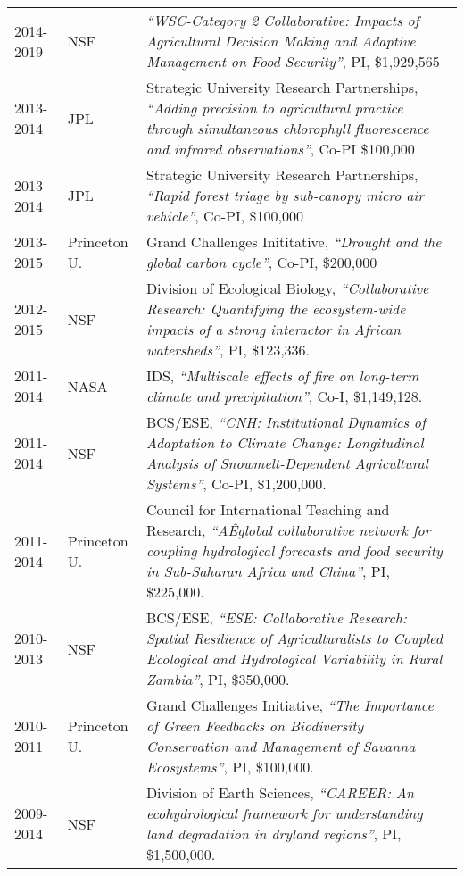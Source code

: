 \documentclass[10pt]{report}
\begin{document}
\begin{longtable}{ l p{.8in} p{5in}  }
2014-2019 & NSF & \emph{``WSC-Category 2 Collaborative: Impacts of Agricultural Decision Making and Adaptive Management on Food Security''}, PI, \$1,929,565 \\

2013-2014 & JPL & Strategic University Research Partnerships, \emph{``Adding precision to agricultural practice through simultaneous chlorophyll fluorescence and infrared observations''}, Co-PI \$100,000 \\
 
2013-2014 & JPL & Strategic University Research Partnerships, \emph{``Rapid forest triage by sub-canopy micro air vehicle''}, Co-PI, \$100,000 \\

2013-2015 & Princeton U. & Grand Challenges Inititative, \emph{``Drought and the global carbon cycle''}, Co-PI, \$200,000 \\ 

2012-2015 & NSF & Division of Ecological Biology, \emph{``Collaborative Research: Quantifying the ecosystem-wide impacts of a strong interactor in African watersheds''}, PI, \$123,336. \\

2011-2014 & NASA & IDS, \emph{``Multiscale effects of fire on long-term climate and precipitation''}, Co-I, \$1,149,128. \\

2011-2014 & NSF & BCS/ESE, \emph{``CNH: Institutional Dynamics of Adaptation to Climate Change: Longitudinal Analysis of Snowmelt-Dependent Agricultural Systems''}, Co-PI, \$1,200,000. \\

2011-2014 & Princeton U. & Council for International Teaching and Research, \emph{``AÊglobal collaborative network for coupling hydrological forecasts and food security in Sub-Saharan Africa and China''}, PI, \$225,000. \\
	
2010-2013 & NSF & BCS/ESE, \emph{``ESE: Collaborative Research: Spatial Resilience of Agriculturalists to Coupled Ecological and Hydrological Variability in Rural Zambia''}, PI, \$350,000. \\

2010-2011 & Princeton U. & Grand Challenges Initiative, \emph{``The Importance of Green Feedbacks on Biodiversity Conservation and Management of Savanna Ecosystems''}, PI, \$100,000. \\

2009-2014 & NSF & Division of Earth Sciences, \emph{``CAREER: An ecohydrological framework for understanding land degradation in dryland regions''}, PI, \$1,500,000. \\


\end{longtable}
\end{document}
